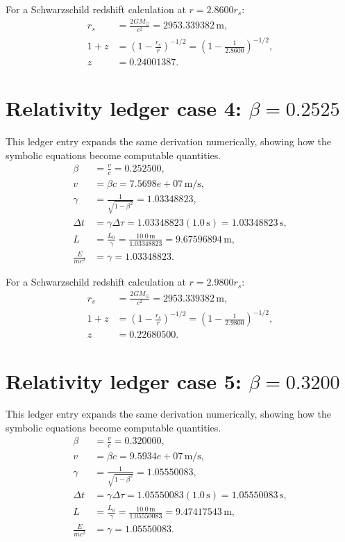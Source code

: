 \documentclass[11pt,a4paper]{article}
\begin{document}
For a Schwarzschild redshift calculation at $r=2.8600r_s$:
\begin{align}
r_s &= \frac{2GM_\odot}{c^2}=2953.339382\,\mathrm{m},\\
1+z &= \left(1-\frac{r_s}{r}\right)^{-1/2}
=\left(1-\frac{1}{2.8600}\right)^{-1/2},\\
z&=0.24001387.
\end{align}

\section{Relativity ledger case 4: $\beta=0.2525$}
This ledger entry expands the same derivation numerically, showing how the symbolic equations become computable quantities.
\begin{align}
\beta &= \frac{v}{c}=0.252500,\\
v &= \beta c = 7.5698e+07\,\mathrm{m/s},\\
\gamma &= \frac{1}{\sqrt{1-\beta^2}} = 1.03348823,\\
\Delta t &= \gamma\Delta\tau = 1.03348823(1.0\,\mathrm{s}) = 1.03348823\,\mathrm{s},\\
L &= \frac{L_0}{\gamma} = \frac{10.0\,\mathrm{m}}{1.03348823} = 9.67596894\,\mathrm{m},\\
\frac{E}{mc^2}&=\gamma=1.03348823.
\end{align}

For a Schwarzschild redshift calculation at $r=2.9800r_s$:
\begin{align}
r_s &= \frac{2GM_\odot}{c^2}=2953.339382\,\mathrm{m},\\
1+z &= \left(1-\frac{r_s}{r}\right)^{-1/2}
=\left(1-\frac{1}{2.9800}\right)^{-1/2},\\
z&=0.22680500.
\end{align}

\newpage

\section{Relativity ledger case 5: $\beta=0.3200$}
This ledger entry expands the same derivation numerically, showing how the symbolic equations become computable quantities.
\begin{align}
\beta &= \frac{v}{c}=0.320000,\\
v &= \beta c = 9.5934e+07\,\mathrm{m/s},\\
\gamma &= \frac{1}{\sqrt{1-\beta^2}} = 1.05550083,\\
\Delta t &= \gamma\Delta\tau = 1.05550083(1.0\,\mathrm{s}) = 1.05550083\,\mathrm{s},\\
L &= \frac{L_0}{\gamma} = \frac{10.0\,\mathrm{m}}{1.05550083} = 9.47417543\,\mathrm{m},\\
\frac{E}{mc^2}&=\gamma=1.05550083.
\end{align}
\end{document}
